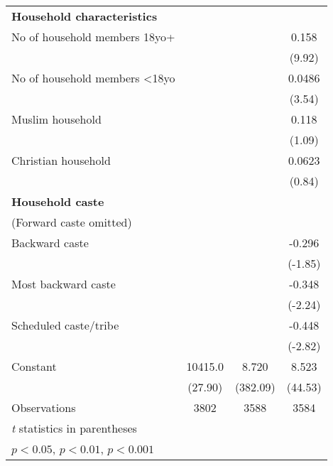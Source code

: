 {\begin{tabular}{l*{3}{c}}
\textbf{Household characteristics}&                     &                     &                     \\
[1em]
No of household members 18yo+&                     &                     &       0.158\sym{***}\\
                    &                     &                     &      (9.92)         \\
[1em]
No of household members \textless{}18yo&                     &                     &      0.0486\sym{***}\\
                    &                     &                     &      (3.54)         \\
[1em]
Muslim household    &                     &                     &       0.118         \\
                    &                     &                     &      (1.09)         \\
[1em]
Christian household &                     &                     &      0.0623         \\
                    &                     &                     &      (0.84)         \\
[1em]
\textbf{Household caste} \\ (Forward caste omitted)&                     &                     &                     \\
[1em]
Backward caste      &                     &                     &      -0.296         \\
                    &                     &                     &     (-1.85)         \\
[1em]
Most backward caste &                     &                     &      -0.348\sym{*}  \\
                    &                     &                     &     (-2.24)         \\
[1em]
Scheduled caste/tribe&                     &                     &      -0.448\sym{**} \\
                    &                     &                     &     (-2.82)         \\
[1em]
Constant            &     10415.0\sym{***}&       8.720\sym{***}&       8.523\sym{***}\\
                    &     (27.90)         &    (382.09)         &     (44.53)         \\
\hline
Observations        &        3802         &        3588         &        3584         \\
\hline\hline
\multicolumn{4}{l}{\footnotesize \textit{t} statistics in parentheses}\\
\multicolumn{4}{l}{\footnotesize \sym{*} \(p<0.05\), \sym{**} \(p<0.01\), \sym{***} \(p<0.001\)}\\
\end{tabular}
}
